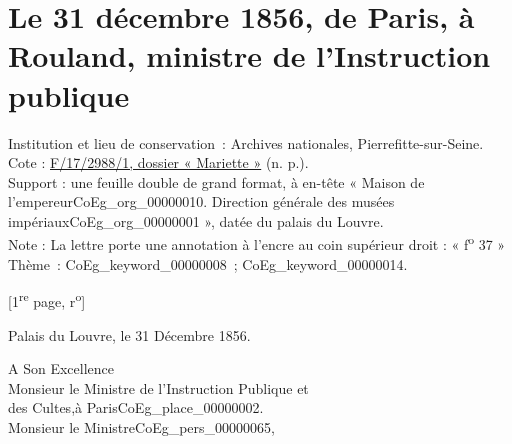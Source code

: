 \documentclass{book}
\begin{document}
\hypertarget{CoEg_Mariette_1856-12-31}{}

\section*{Le 31 décembre 1856, de Paris, à Rouland, ministre de l’Instruction publique}
 \label{labCoEg_Mariette_1856-12-31}
{\footnotesize
\noindent Institution et lieu de conservation~: Archives nationales, Pierrefitte-sur-Seine.\\
Cote : \hyperlink{CoEg_Mariette_ms_002}{F/17/2988/1, dossier « Mariette »} (n. p.).\\
Support : une feuille double de grand format, à en-tête « Maison de l’empereur\gls{CoEg_org_00000010}. Direction générale des musées impériaux\gls{CoEg_org_00000001} », datée du palais du Louvre.\\
Note : La lettre porte une annotation à l'encre au coin supérieur droit : « f\textsuperscript{o} 37 »\\
Thème~: \gls{CoEg_keyword_00000008}~; \gls{CoEg_keyword_00000014}.}

{\footnotesize\begin{center} {[1\textsuperscript{re} page, r\textsuperscript{o}]}\end{center}}
\begin{flushright}Palais du Louvre, le 31 Décembre 1856.\end{flushright}
\indent A Son Excellence\\
\indent Monsieur le Ministre de l’Instruction Publique et\\
\indent \hspace{1cm}des Cultes,\hspace{2cm}à Paris\gls{CoEg_place_00000002}.\\

\hspace{1cm} Monsieur le Ministre\gls{CoEg_pers_00000065},\\
\end{document}

